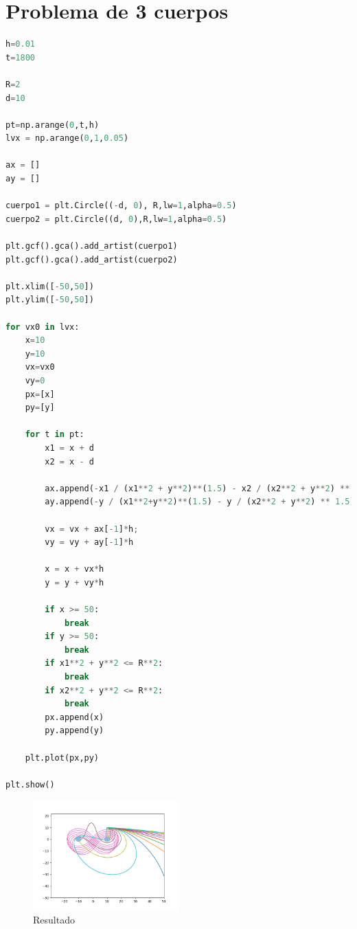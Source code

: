\documentclass{article}
\begin{document}
\section{Problema de 3 cuerpos}
\begin{lstlisting}[language=Python,caption=2.py]
h=0.01
t=1800

R=2
d=10

pt=np.arange(0,t,h)
lvx = np.arange(0,1,0.05)

ax = []
ay = []

cuerpo1 = plt.Circle((-d, 0), R,lw=1,alpha=0.5)
cuerpo2 = plt.Circle((d, 0),R,lw=1,alpha=0.5)

plt.gcf().gca().add_artist(cuerpo1)
plt.gcf().gca().add_artist(cuerpo2)

plt.xlim([-50,50])
plt.ylim([-50,50])

for vx0 in lvx:
    x=10
    y=10
    vx=vx0
    vy=0
    px=[x]
    py=[y]

    for t in pt:
        x1 = x + d
        x2 = x - d

        ax.append(-x1 / (x1**2 + y**2)**(1.5) - x2 / (x2**2 + y**2) ** 1.5)
        ay.append(-y / (x1**2+y**2)**(1.5) - y / (x2**2 + y**2) ** 1.5)
        
        vx = vx + ax[-1]*h;
        vy = vy + ay[-1]*h
        
        x = x + vx*h 
        y = y + vy*h
        
        if x >= 50:
            break
        if y >= 50:
            break
        if x1**2 + y**2 <= R**2:
            break
        if x2**2 + y**2 <= R**2:
            break
        px.append(x)
        py.append(y)

    plt.plot(px,py)

plt.show()
\end{lstlisting}
\begin{figure}[H]
    \centering
    \includegraphics[width=0.5\textwidth]{2.png}
    \caption{Resultado}
\end{figure}
\end{document}
